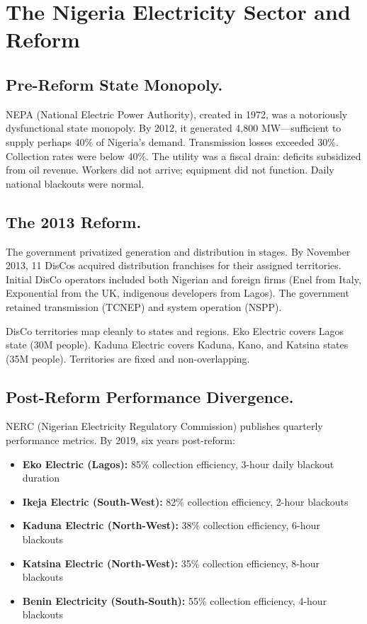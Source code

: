 \documentclass[12pt]{article}
\begin{document}
\section{The Nigeria Electricity Sector and Reform}

\subsection*{Pre-Reform State Monopoly.}
NEPA (National Electric Power Authority), created in 1972, was a notoriously dysfunctional state monopoly. By 2012, it generated 4,800 MW---sufficient to supply perhaps 40\% of Nigeria's demand. Transmission losses exceeded 30\%. Collection rates were below 40\%. The utility was a fiscal drain: deficits subsidized from oil revenue. Workers did not arrive; equipment did not function. Daily national blackouts were normal.

\subsection*{The 2013 Reform.}
The government privatized generation and distribution in stages. By November 2013, 11 DisCos acquired distribution franchises for their assigned territories. Initial DisCo operators included both Nigerian and foreign firms (Enel from Italy, Exponential from the UK, indigenous developers from Lagos). The government retained transmission (TCNEP) and system operation (NSPP).

DisCo territories map cleanly to states and regions. Eko Electric covers Lagos state (30M people). Kaduna Electric covers Kaduna, Kano, and Katsina states (35M people). Territories are fixed and non-overlapping.

\subsection*{Post-Reform Performance Divergence.}
NERC (Nigerian Electricity Regulatory Commission) publishes quarterly performance metrics. By 2019, six years post-reform:
\begin{itemize}
\item \textbf{Eko Electric (Lagos):} 85\% collection efficiency, 3-hour daily blackout duration
\item \textbf{Ikeja Electric (South-West):} 82\% collection efficiency, 2-hour blackouts
\item \textbf{Kaduna Electric (North-West):} 38\% collection efficiency, 6-hour blackouts
\item \textbf{Katsina Electric (North-West):} 35\% collection efficiency, 8-hour blackouts
\item \textbf{Benin Electricity (South-South):} 55\% collection efficiency, 4-hour blackouts
\end{itemize}
\end{document}
